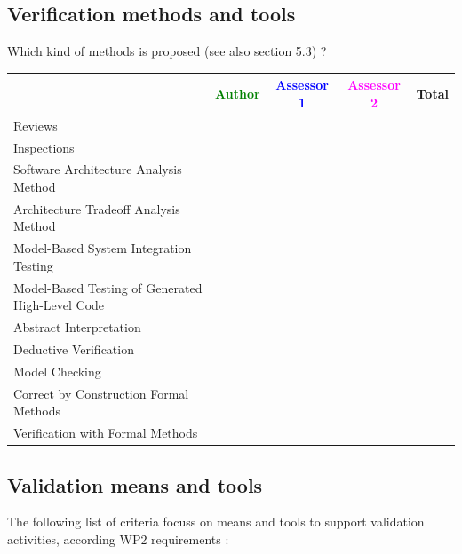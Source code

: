 \subsection{Verification methods and tools}

Which kind of methods is proposed (see also \citep{D4.1} section 5.3) ?



\begin{tabular}{|l | c | c | c | c|}
\hline
& \textcolor{green}{Author} & \textcolor{blue}{Assessor 1} & \textcolor{magenta}{Assessor 2} & Total \\
\hline 
Reviews & & & &  \\
\hline
Inspections & & & &  \\
\hline
Software Architecture Analysis Method & & & &  \\
\hline
Architecture Tradeoff Analysis Method & & & &  \\
\hline
Model-Based System Integration Testing & & & &  \\
\hline
Model-Based Testing of Generated High-Level Code & & & &  \\
\hline
Abstract Interpretation & & & &  \\
\hline
Deductive Verification & & & &  \\
\hline
Model Checking & & & &  \\
\hline
Correct by Construction Formal Methods & & & &  \\
\hline
Verification with Formal Methods & & & &  \\
\hline
\end{tabular}

\subsection{Validation means and tools}

The following list of criteria focuss on means and tools to support validation activities, according WP2  requirements :

